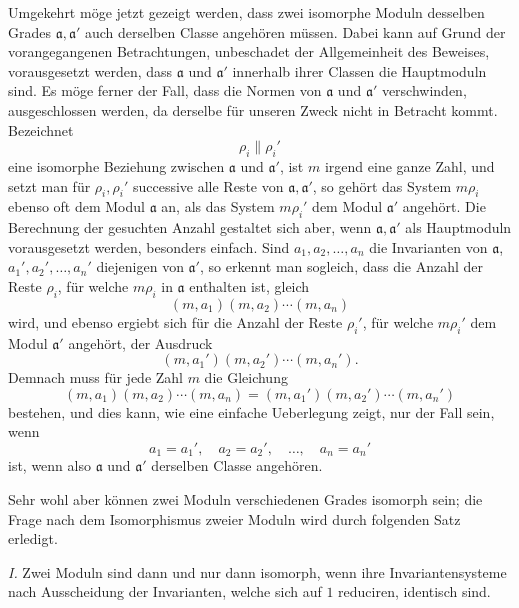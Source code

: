 Umgekehrt möge jetzt gezeigt werden, dass zwei isomorphe Moduln desselben Grades $\mathfrak a,\mathfrak a'$ auch derselben Classe angehören müssen. Dabei kann auf Grund der vorangegangenen Betrachtungen, unbeschadet der Allgemeinheit des Beweises, vorausgesetzt werden, dass $\mathfrak a$ und $\mathfrak a'$ innerhalb ihrer Classen die Hauptmoduln sind. Es möge ferner der Fall, dass die Normen von $\mathfrak a$ und $\mathfrak a'$ verschwinden, ausgeschlossen werden, da derselbe für unseren Zweck nicht in Betracht kommt. Bezeichnet
\[
 \rho_i\parallel \rho_i'
\]
eine isomorphe Beziehung zwischen $\mathfrak a$ und $\mathfrak a'$, ist $m$ irgend eine ganze Zahl, und setzt man für $\rho_i,\rho_i'$ successive alle Reste von $\mathfrak a,\mathfrak a'$, so gehört das System $m\rho_i$ ebenso oft dem Modul $\mathfrak a$ an, als das System $m\rho_i'$ dem Modul $\mathfrak a'$ angehört. Die Berechnung der gesuchten Anzahl gestaltet sich aber, wenn $\mathfrak a,\mathfrak a'$ als Hauptmoduln vorausgesetzt werden, besonders einfach. Sind $a_1,a_2,\ldots,a_n$ die Invarianten von $\mathfrak a$, $a_1',a_2',\ldots,a_n'$ diejenigen von $\mathfrak a'$, so erkennt man sogleich, dass die Anzahl der Reste $\rho_i$, für welche $m\rho_i$ in $\mathfrak a$ enthalten ist, gleich
\[
 (m,a_1)(m,a_2)\cdots(m,a_n)
\]
wird, und ebenso ergiebt sich für die Anzahl der Reste $\rho_i'$, für welche $m\rho_i'$ dem Modul $\mathfrak a'$ angehört, der Ausdruck
\[
 (m,a_1')(m,a_2')\cdots(m,a_n').
\]
Demnach muss für jede Zahl $m$ die Gleichung
\[
 (m,a_1)(m,a_2)\cdots(m,a_n)=(m,a_1')(m,a_2')\cdots(m,a_n')
\]
bestehen, und dies kann, wie eine einfache Ueberlegung zeigt, nur der Fall sein, wenn
\[
 a_1=a_1',\quad a_2=a_2',\quad\ldots,\quad a_n=a_n'
\]
ist, wenn also $\mathfrak a$ und $\mathfrak a'$ derselben Classe angehören.

Sehr wohl aber können zwei Moduln verschiedenen Grades isomorph sein; die Frage nach dem Isomorphismus zweier Moduln wird durch folgenden Satz erledigt.

\emph{I.} Zwei Moduln sind dann und nur dann isomorph, wenn ihre Invariantensysteme nach Ausscheidung der Invarianten, welche sich auf $1$ reduciren, identisch sind.

